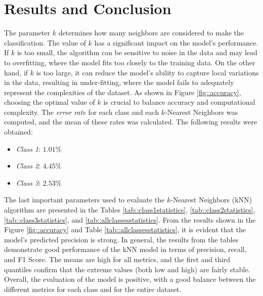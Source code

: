 \documentclass[9pt,technote]{IEEEtran}
\begin{document}
\section{Results and Conclusion}
The parameter $k$ determines how many neighbors are considered to make the classification. The value of $k$ has a significant impact on the model's performance. If $k$ is too small, the algorithm can be sensitive to noise in the data and may lead to overfitting, where the model fits too closely to the training data. On the other hand, if $k$ is too large, it can reduce the model's ability to capture local variations in the data, resulting in under-fitting, where the model fails to adequately represent the complexities of the dataset. As shown in Figure \ref{fig::accuracy}, choosing the optimal value of $k$ is crucial to balance accuracy and computational complexity.
The \textit{error rate} for each class and each $k$-Nearest Neighbors was computed, and the mean of these rates was calculated. The following results were obtained:
\begin{itemize}
	\item \textit{Class 1}: $1.01\%$
	\item \textit{Class 2}: $4.45\%$
	\item \textit{Class 3}: $2.53\%$
\end{itemize}
The last important parameters used to evaluate the $k$-Nearest Neighbors (kNN) algorithm are presented in the Tables \ref{tab::class1statistics}, \ref{tab::class2statistics}, \ref{tab::class3statistics}, and \ref{tab::allclassesstatistics}. From the results shown in the Figure \ref{fig::accuracy} and Table \ref{tab::allclassesstatistics}, it is evident that the model's predicted precision is strong.
In general, the results from the tables demonstrate good performance of the kNN model in terms of precision, recall, and F1 Score. The means are high for all metrics, and the first and third quantiles confirm that the extreme values (both low and high) are fairly stable. Overall, the evaluation of the model is positive, with a good balance between the different metrics for each class and for the entire dataset.



\end{document}
